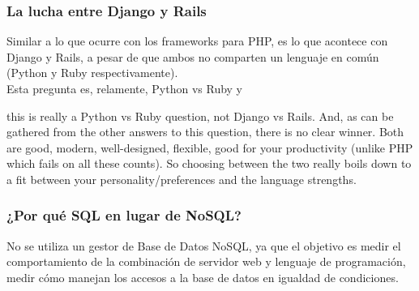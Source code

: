 \subsubsection{La lucha entre Django y Rails}

Similar a lo que ocurre con los frameworks para PHP, es lo que acontece con Django y Rails, a pesar
de que ambos no comparten un lenguaje en común (Python y Ruby respectivamente).\\

Esta pregunta es, relamente, Python vs Ruby y

 this is really a Python vs Ruby question, not Django vs Rails. And, as can be gathered from the other answers 
 to this question, there is no clear winner. Both are good, modern, well-designed, flexible, good for your
 productivity (unlike PHP which fails on all these counts). So choosing between the two really boils down to
 a fit between your personality/preferences and the language strengths.
\subsubsection{¿Por qué SQL en lugar de NoSQL?}
No se utiliza un gestor de Base de Datos NoSQL, ya que el objetivo es medir el comportamiento de
la combinación de servidor web y lenguaje de programación, medir cómo manejan los accesos a la base 
de datos en igualdad de condiciones.\\
\newpage


